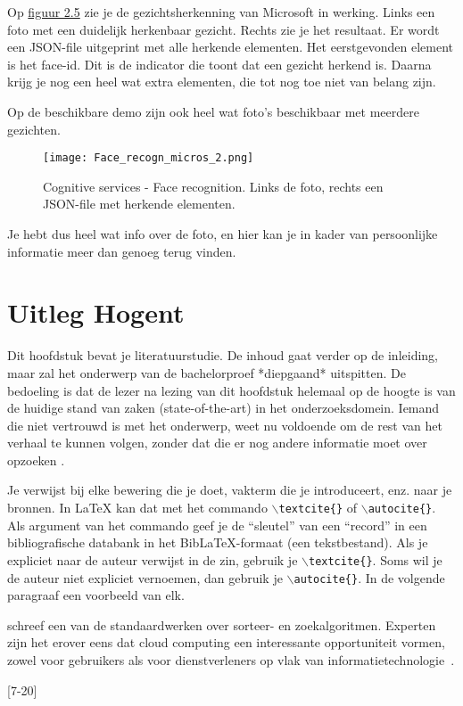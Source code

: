 Op \hyperref[fig:cognitive]{figuur 2.5} zie je de gezichtsherkenning van Microsoft in werking. Links een foto met een duidelijk herkenbaar gezicht. Rechts zie je het resultaat. Er wordt een JSON-file uitgeprint met alle herkende elementen. Het eerstgevonden element is het face-id. Dit is de indicator die toont dat een gezicht herkend is. Daarna krijg je nog een heel wat extra elementen, die tot nog toe niet van belang zijn. 

Op de beschikbare demo zijn ook heel wat foto's beschikbaar met meerdere gezichten.

\begin{figure}[h]
    \texttt{[image: Face\_recogn\_micros\_2.png]}
    \caption{Cognitive services - Face recognition. Links de foto, rechts een JSON-file met herkende elementen.}
    \label{fig:cognitive}
\end{figure}

Je hebt dus heel wat info over de foto, en hier kan je in kader van persoonlijke informatie meer dan genoeg terug vinden. 


\section{{Uitleg Hogent}}
Dit hoofdstuk bevat je literatuurstudie. De inhoud gaat verder op de inleiding, maar zal het onderwerp van de bachelorproef *diepgaand* uitspitten. De bedoeling is dat de lezer na lezing van dit hoofdstuk helemaal op de hoogte is van de huidige stand van zaken (state-of-the-art) in het onderzoeksdomein. Iemand die niet vertrouwd is met het onderwerp, weet nu voldoende om de rest van het verhaal te kunnen volgen, zonder dat die er nog andere informatie moet over opzoeken \autocite{Pollefliet2011}.

Je verwijst bij elke bewering die je doet, vakterm die je introduceert, enz. naar je bronnen. In \LaTeX{} kan dat met het commando \texttt{$\backslash${textcite\{\}}} of \texttt{$\backslash${autocite\{\}}}. Als argument van het commando geef je de ``sleutel'' van een ``record'' in een bibliografische databank in het Bib\LaTeX{}-formaat (een tekstbestand). Als je expliciet naar de auteur verwijst in de zin, gebruik je \texttt{$\backslash${}textcite\{\}}.
Soms wil je de auteur niet expliciet vernoemen, dan gebruik je \texttt{$\backslash${}autocite\{\}}. In de volgende paragraaf een voorbeeld van elk.
\textcite{Lusignan2014} \textcite{ronnie}

\textcite{Knuth1998} schreef een van de standaardwerken over sorteer- en zoekalgoritmen. Experten zijn het erover eens dat cloud computing een interessante opportuniteit vormen, zowel voor gebruikers als voor dienstverleners op vlak van informatietechnologie~\autocite{Creeger2009}.

[7-20]
